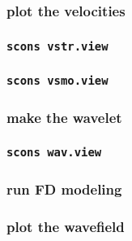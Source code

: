 \begin{frame} \frametitle{plot the velocities}
\end{frame}
\cwpnote{}

\begin{frame} \frametitle{\texttt{scons vstr.view}}
\end{frame}
\begin{frame} \frametitle{\texttt{scons vsmo.view}}
\end{frame}

\begin{frame} \frametitle{make the wavelet}
\end{frame}
\cwpnote{}

\begin{frame} \frametitle{\texttt{scons wav.view}}
\end{frame}

\begin{frame} \frametitle{run FD modeling}
\end{frame}
\cwpnote{}

\begin{frame} \frametitle{plot the wavefield}
\end{frame}
\cwpnote{}

